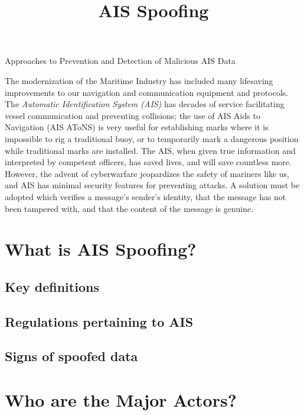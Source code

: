 \documentclass[
]{article}
\title{AIS Spoofing}
\subtitle{R. Ben Voth, Joey Simone

California State University Maritime Academy

Capstone: Maritime Profession People and Planet

Dr. Bets McNie

8 APR 2024}
\author{}
\date{}
\begin{document}
\maketitle

Approaches to Prevention and Detection of Malicious AIS Data

The modernization of the Maritime Industry has included many lifesaving
improvements to our navigation and communication equipment and
protocols. The \emph{Automatic Identification System (AIS)} has decades
of service facilitating vessel communication and preventing collisions;
the use of AIS Aids to Navigation (AIS AToNS) is very useful for
establishing marks where it is impossible to rig a traditional buoy, or
to temporarily mark a dangerous position while traditional marks are
installed. The AIS, when given true information and interpreted by
competent officers, has saved lives, and will save countless more.
However, the advent of cyberwarfare jeopardizes the safety of mariners
like us, and AIS has minimal security features for preventing attacks. A
solution must be adopted which verifies a message's sender's identity,
that the message has not been tampered with, and that the content of the
message is genuine.

\hypertarget{what-is-ais-spoofing}{%
\section{What is AIS Spoofing?}\label{what-is-ais-spoofing}}

\hypertarget{key-definitions}{%
\subsection{Key definitions}\label{key-definitions}}

\hypertarget{regulations-pertaining-to-ais}{%
\subsection{Regulations pertaining to
AIS}\label{regulations-pertaining-to-ais}}

\hypertarget{signs-of-spoofed-data}{%
\subsection{Signs of spoofed data}\label{signs-of-spoofed-data}}

\hypertarget{who-are-the-major-actors}{%
\section{Who are the Major Actors?}\label{who-are-the-major-actors}}
\end{document}
